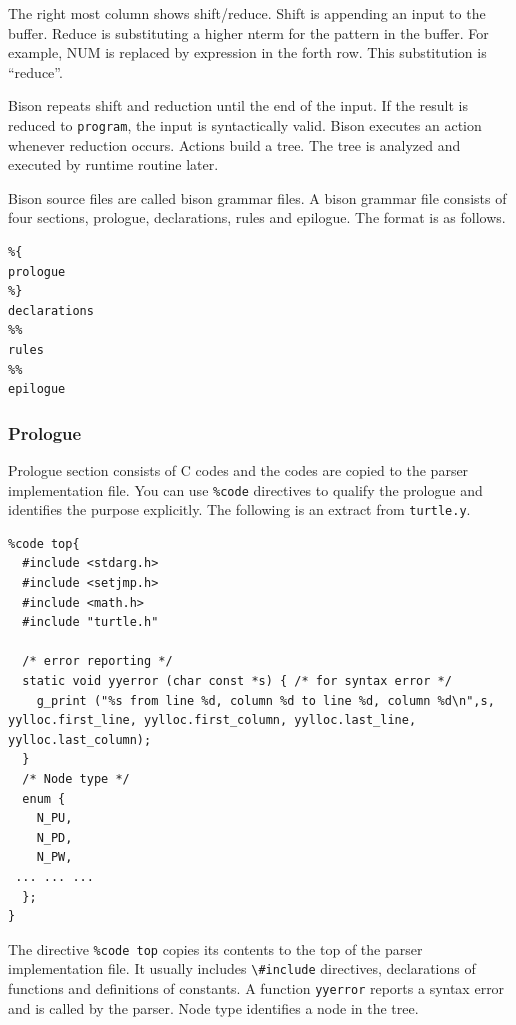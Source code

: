 The right most column shows shift/reduce. Shift is appending an input to
the buffer. Reduce is substituting a higher nterm for the pattern in the
buffer. For example, NUM is replaced by expression in the forth row.
This substitution is ``reduce''.

Bison repeats shift and reduction until the end of the input. If the
result is reduced to \passthrough{\lstinline!program!}, the input is
syntactically valid. Bison executes an action whenever reduction occurs.
Actions build a tree. The tree is analyzed and executed by runtime
routine later.

Bison source files are called bison grammar files. A bison grammar file
consists of four sections, prologue, declarations, rules and epilogue.
The format is as follows.

\begin{lstlisting}
%{
prologue
%}
declarations
%%
rules
%%
epilogue
\end{lstlisting}

\hypertarget{prologue}{%
\subsubsection{Prologue}\label{prologue}}

Prologue section consists of C codes and the codes are copied to the
parser implementation file. You can use \passthrough{\lstinline!\%code!}
directives to qualify the prologue and identifies the purpose
explicitly. The following is an extract from
\passthrough{\lstinline!turtle.y!}.

\begin{lstlisting}
%code top{
  #include <stdarg.h>
  #include <setjmp.h>
  #include <math.h>
  #include "turtle.h"

  /* error reporting */
  static void yyerror (char const *s) { /* for syntax error */
    g_print ("%s from line %d, column %d to line %d, column %d\n",s, yylloc.first_line, yylloc.first_column, yylloc.last_line, yylloc.last_column);
  }
  /* Node type */
  enum {
    N_PU,
    N_PD,
    N_PW,
 ... ... ...
  };
}
\end{lstlisting}

The directive \passthrough{\lstinline!\%code top!} copies its contents
to the top of the parser implementation file. It usually includes
\passthrough{\lstinline!\#include!} directives, declarations of
functions and definitions of constants. A function
\passthrough{\lstinline!yyerror!} reports a syntax error and is called
by the parser. Node type identifies a node in the tree.


